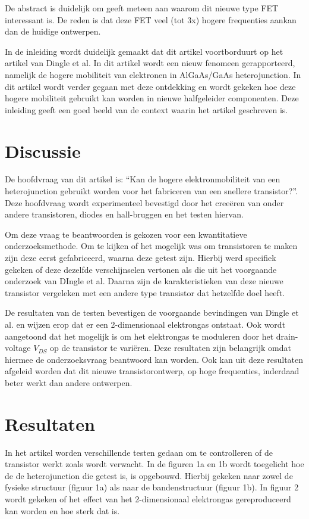 \documentclass[11pt]{article}
\begin{document}
De abstract is duidelijk om geeft meteen aan waarom dit nieuwe type FET interessant is. De reden is dat deze FET veel (tot 3x) hogere frequenties aankan dan de huidige ontwerpen. 

In de inleiding wordt duidelijk gemaakt dat dit artikel voortborduurt op het artikel van Dingle et al. In dit artikel wordt een nieuw fenomeen gerapporteerd, namelijk de hogere mobiliteit van elektronen in AlGaAs/GaAs heterojunction. In dit artikel wordt verder gegaan met deze ontdekking en wordt gekeken hoe deze hogere mobiliteit gebruikt kan worden in nieuwe halfgeleider componenten. Deze inleiding geeft een goed beeld van de context waarin het artikel geschreven is.

\section{Discussie}
De hoofdvraag van dit artikel is: ``Kan de hogere elektronmobiliteit van een heterojunction gebruikt worden voor het fabriceren van een snellere transistor?''. Deze hoofdvraag wordt experimenteel bevestigd door het cree\"eren van onder andere transistoren, diodes en hall-bruggen en het testen hiervan.

Om deze vraag te beantwoorden is gekozen voor een kwantitatieve onderzoeksmethode. Om te kijken of het mogelijk was om transistoren te maken zijn deze eerst gefabriceerd, waarna deze getest zijn. Hierbij werd specifiek gekeken of deze dezelfde verschijnselen vertonen als die uit het voorgaande onderzoek van DIngle et al. Daarna zijn de karakteristieken van deze nieuwe transistor vergeleken met een andere type transistor dat hetzelfde doel heeft.

De resultaten van de testen bevestigen de voorgaande bevindingen van Dingle et al. en wijzen erop dat er een 2-dimensionaal elektrongas ontstaat. Ook wordt aangetoond dat het mogelijk is om het elektrongas te moduleren door het drain-voltage $V_{DS}$ op de transistor te vari\"eren. Deze resultaten zijn belangrijk omdat hiermee de onderzoeksvraag beantwoord kan worden. Ook kan uit deze resultaten afgeleid worden dat dit nieuwe transistorontwerp, op hoge frequenties, inderdaad beter werkt dan andere ontwerpen.

\newpage

\section{Resultaten}
In het artikel worden verschillende testen gedaan om te controlleren of de transistor werkt zoals wordt verwacht. In de figuren 1a en 1b wordt toegelicht hoe de de heterojunction die getest is, is opgebouwd. Hierbij gekeken naar zowel de fysieke structuur (figuur 1a) als naar de bandenstructuur (figuur 1b).
In figuur 2 wordt gekeken of het effect van het 2-dimensionaal elektrongas gereproduceerd kan worden en hoe sterk dat is.
\end{document}
